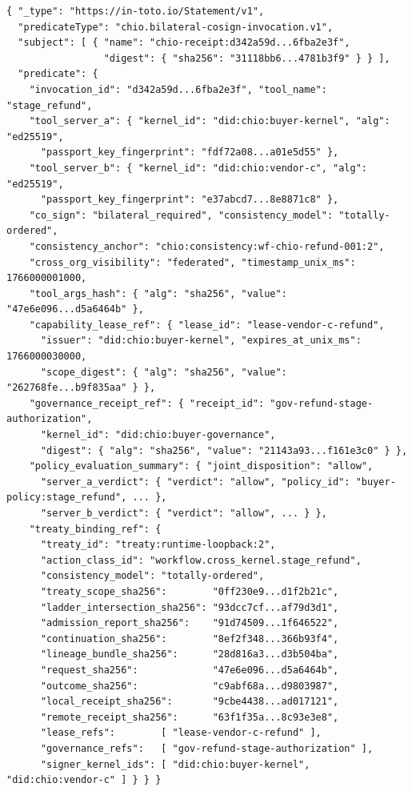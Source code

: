 \begin{lstlisting}
{ "_type": "https://in-toto.io/Statement/v1",
  "predicateType": "chio.bilateral-cosign-invocation.v1",
  "subject": [ { "name": "chio-receipt:d342a59d...6fba2e3f",
                 "digest": { "sha256": "31118bb6...4781b3f9" } } ],
  "predicate": {
    "invocation_id": "d342a59d...6fba2e3f", "tool_name": "stage_refund",
    "tool_server_a": { "kernel_id": "did:chio:buyer-kernel", "alg": "ed25519",
      "passport_key_fingerprint": "fdf72a08...a01e5d55" },
    "tool_server_b": { "kernel_id": "did:chio:vendor-c", "alg": "ed25519",
      "passport_key_fingerprint": "e37abcd7...8e8871c8" },
    "co_sign": "bilateral_required", "consistency_model": "totally-ordered",
    "consistency_anchor": "chio:consistency:wf-chio-refund-001:2",
    "cross_org_visibility": "federated", "timestamp_unix_ms": 1766000001000,
    "tool_args_hash": { "alg": "sha256", "value": "47e6e096...d5a6464b" },
    "capability_lease_ref": { "lease_id": "lease-vendor-c-refund",
      "issuer": "did:chio:buyer-kernel", "expires_at_unix_ms": 1766000030000,
      "scope_digest": { "alg": "sha256", "value": "262768fe...b9f835aa" } },
    "governance_receipt_ref": { "receipt_id": "gov-refund-stage-authorization",
      "kernel_id": "did:chio:buyer-governance",
      "digest": { "alg": "sha256", "value": "21143a93...f161e3c0" } },
    "policy_evaluation_summary": { "joint_disposition": "allow",
      "server_a_verdict": { "verdict": "allow", "policy_id": "buyer-policy:stage_refund", ... },
      "server_b_verdict": { "verdict": "allow", ... } },
    "treaty_binding_ref": {
      "treaty_id": "treaty:runtime-loopback:2",
      "action_class_id": "workflow.cross_kernel.stage_refund",
      "consistency_model": "totally-ordered",
      "treaty_scope_sha256":        "0ff230e9...d1f2b21c",
      "ladder_intersection_sha256": "93dcc7cf...af79d3d1",
      "admission_report_sha256":    "91d74509...1f646522",
      "continuation_sha256":        "8ef2f348...366b93f4",
      "lineage_bundle_sha256":      "28d816a3...d3b504ba",
      "request_sha256":             "47e6e096...d5a6464b",
      "outcome_sha256":             "c9abf68a...d9803987",
      "local_receipt_sha256":       "9cbe4438...ad017121",
      "remote_receipt_sha256":      "63f1f35a...8c93e3e8",
      "lease_refs":        [ "lease-vendor-c-refund" ],
      "governance_refs":   [ "gov-refund-stage-authorization" ],
      "signer_kernel_ids": [ "did:chio:buyer-kernel", "did:chio:vendor-c" ] } } }
\end{lstlisting}

